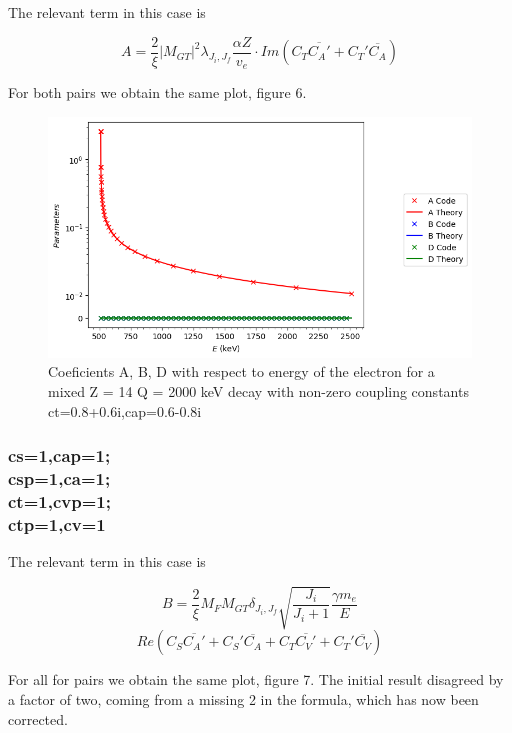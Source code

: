 \documentclass[twocolumn]{article}
\begin{document}
 The relevant term in this case is 
 
 $$A= \frac{2}{\xi}|M_{GT}|^2\lambda_{J_i,J_f}\frac{\alpha Z}{v_e}\cdot Im(C_T\overline{C_A'}+C_T'\overline{C_A})$$
 
 For both pairs we obtain the same plot, figure 6.
 
 \begin{figure}
 	\centering
 	\includegraphics[width=\columnwidth]{plots/ctcap_comp_mixed_result.png}
 	\caption{Coeficients A, B, D with respect to energy of the electron for a mixed Z = 14 Q = 2000 keV decay with non-zero coupling constants ct=0.8+0.6i,cap=0.6-0.8i}
 \end{figure}
 
 \subsubsection*{cs=1,cap=1;\\csp=1,ca=1;\\ct=1,cvp=1;\\ctp=1,cv=1}

 The relevant term in this case is 

 $$B = \frac{2}{\xi}M_FM_{GT}\delta_{J_i,J_f}\sqrt{\frac{J_i}{J_i+1}}\frac{\gamma m_e}{E}$$$$Re(C_S\overline{C_A'}+C_S'\overline{C_A}+C_T\overline{C_V'}+C_T'\overline{C_V})$$

 For all for pairs we obtain the same plot, figure 7. The initial result disagreed by a factor of two, coming from a missing 2 in the formula, which has now been corrected.
 
\end{document}
